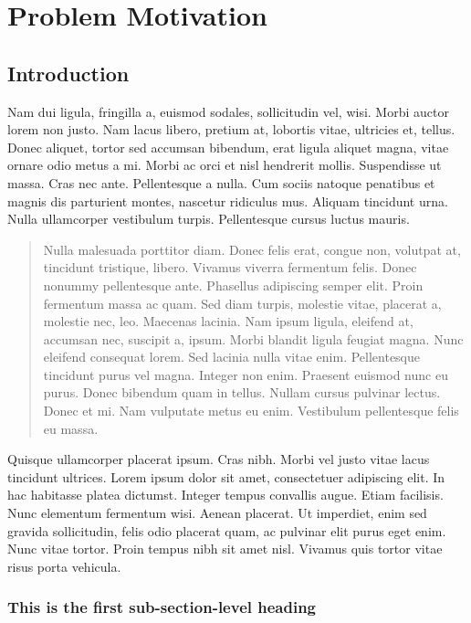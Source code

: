 \chapter{Problem Motivation}

\lipsum[2]

\section{Introduction}

Nam dui ligula, fringilla a, euismod sodales, sollicitudin vel, wisi. Morbi auctor
lorem non justo. Nam lacus libero, pretium at, lobortis vitae, ultricies et, tellus. Donec
aliquet, tortor sed accumsan bibendum, erat ligula aliquet magna, vitae ornare odio
metus a mi. Morbi ac orci et nisl hendrerit mollis. Suspendisse ut massa. Cras nec ante.
Pellentesque a nulla. Cum sociis natoque penatibus et magnis dis parturient montes,
nascetur ridiculus mus. Aliquam tincidunt urna. Nulla ullamcorper vestibulum turpis.
Pellentesque cursus luctus mauris.
\begin{quote}
Nulla malesuada porttitor diam. Donec felis erat, congue non, volutpat
at, tincidunt tristique, libero. Vivamus viverra fermentum felis. Donec
nonummy pellentesque ante. Phasellus adipiscing semper elit. Proin
fermentum massa ac quam. Sed diam turpis, molestie vitae, placerat
a, molestie nec, leo. Maecenas lacinia. Nam ipsum ligula, eleifend at,
accumsan nec, suscipit a, ipsum. Morbi blandit ligula feugiat magna.
Nunc eleifend consequat lorem. Sed lacinia nulla vitae enim. Pellentesque
tincidunt purus vel magna. Integer non enim. Praesent euismod nunc eu
purus. Donec bibendum quam in tellus. Nullam cursus pulvinar lectus.
Donec et mi. Nam vulputate metus eu enim. Vestibulum pellentesque
felis eu massa.
\end{quote}
Quisque ullamcorper placerat ipsum. Cras nibh. Morbi vel justo vitae lacus tincidunt
ultrices. Lorem ipsum dolor sit amet, consectetuer adipiscing elit. In hac habitasse
platea dictumst. Integer tempus convallis augue. Etiam facilisis. Nunc elementum
fermentum wisi. Aenean placerat. Ut imperdiet, enim sed gravida sollicitudin, felis
odio placerat quam, ac pulvinar elit purus eget enim. Nunc vitae tortor. Proin tempus
nibh sit amet nisl. Vivamus quis tortor vitae risus porta vehicula.

\subsection{This is the first sub-section-level heading}

